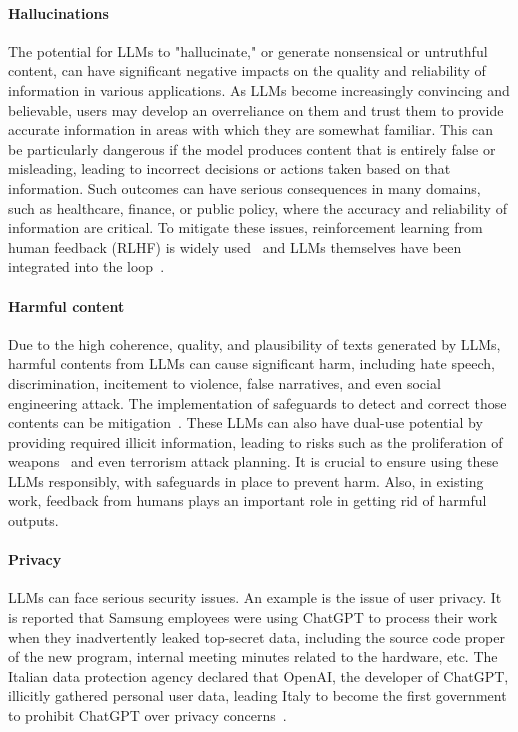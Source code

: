 \documentclass[manuscript,screen, nonacm]{acmart}
\begin{document}
\paragraph{Hallucinations} 

The potential for LLMs to "hallucinate," or generate nonsensical or untruthful content, can have significant negative impacts on the quality and reliability of information in various applications. As LLMs become increasingly convincing and believable, users may develop an overreliance on them and trust them to provide accurate information in areas with which they are somewhat familiar. This can be particularly dangerous if the model produces content that is entirely false or misleading, leading to incorrect decisions or actions taken based on that information. Such outcomes can have serious consequences in many domains, such as healthcare, finance, or public policy, where the accuracy and reliability of information are critical. To mitigate these issues, reinforcement learning from human feedback (RLHF) is widely used~\cite{ouyang2022training, openai2023gpt4-sys}  and LLMs themselves have been integrated into the loop~\cite{openai2023gpt4-sys}.

\paragraph{Harmful content}
Due to the high coherence, quality, and plausibility of texts generated by LLMs, harmful contents from LLMs can cause significant harm, including hate speech, discrimination, incitement to violence, false narratives, and even social engineering attack. The implementation of safeguards to detect and correct those contents can be mitigation~\cite{tang2023science}. These LLMs can also have dual-use potential by providing required illicit information, leading to risks such as the proliferation of weapons~\cite{openai2023gpt4-sys} and even terrorism attack planning. It is crucial to ensure using these LLMs responsibly, with safeguards in place to prevent harm. Also, in existing work, feedback from humans plays an important role in getting rid of harmful outputs. 

\paragraph{Privacy} LLMs can face serious security issues. An example is the issue of user privacy. It is reported that Samsung employees were using ChatGPT to process their work when they inadvertently leaked top-secret data, including the source code proper of the new program, internal meeting minutes related to the hardware, etc. The Italian data protection agency declared that OpenAI, the developer of ChatGPT, illicitly gathered personal user data, leading Italy to become the first government to prohibit ChatGPT over privacy concerns~\cite{ChatGPTI90:online}. 
\end{document}

